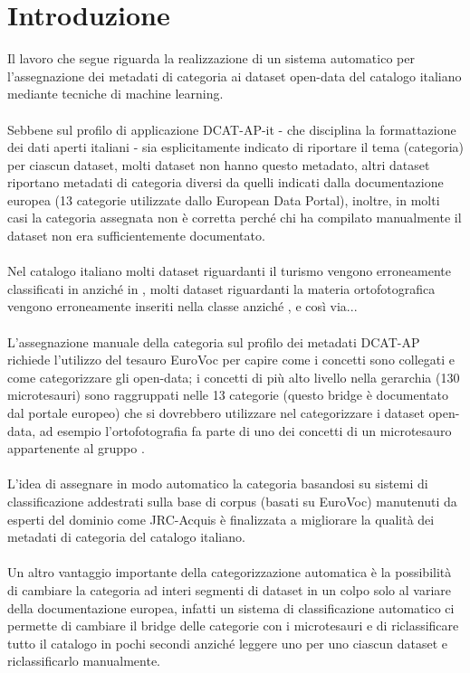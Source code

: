 \documentclass{article}
\theoremstyle{plain}
\theoremstyle{definition}
\begin{document}
\section{Introduzione}
Il lavoro che segue riguarda la realizzazione di un sistema automatico per l'assegnazione dei metadati di categoria ai dataset open-data del catalogo italiano mediante tecniche di machine learning.
\\
\\
Sebbene sul profilo di applicazione DCAT-AP-it - che disciplina la formattazione dei dati aperti italiani - sia esplicitamente indicato di riportare il tema (categoria) per ciascun dataset, molti dataset non hanno questo metadato, altri dataset riportano metadati di categoria diversi da quelli indicati dalla documentazione europea (13 categorie utilizzate dallo European Data Portal), inoltre, in molti casi la categoria assegnata non è corretta perché chi ha compilato manualmente il dataset non era sufficientemente documentato. 
\\
\\
Nel catalogo italiano molti dataset riguardanti
il turismo vengono erroneamente classificati in  anziché in , molti dataset riguardanti la materia ortofotografica vengono erroneamente inseriti nella classe  anziché , e così via...
\\
\\
L'assegnazione manuale della categoria sul profilo dei metadati DCAT-AP richiede l'utilizzo del tesauro EuroVoc per capire come i concetti sono collegati e come categorizzare gli open-data; i concetti di più alto livello nella gerarchia (130 microtesauri) sono raggruppati nelle 13 categorie (questo bridge è documentato dal portale europeo) che si dovrebbero utilizzare nel categorizzare i dataset open-data, ad esempio l'ortofotografia fa parte di uno dei concetti di un microtesauro appartenente al gruppo .
\\
\\
L'idea di assegnare in modo automatico la categoria basandosi su sistemi di classificazione addestrati sulla base di corpus (basati su EuroVoc) manutenuti da esperti del dominio come JRC-Acquis è finalizzata a migliorare la qualità dei metadati di categoria del catalogo italiano.
\\
\\
Un altro vantaggio importante della categorizzazione automatica è la possibilità di cambiare la categoria ad interi segmenti di dataset in un colpo solo al variare della documentazione europea, infatti un sistema di classificazione automatico ci permette di cambiare il bridge delle categorie con i microtesauri e di riclassificare tutto il catalogo in pochi secondi anziché leggere uno per uno ciascun dataset e riclassificarlo manualmente.
\end{document}
